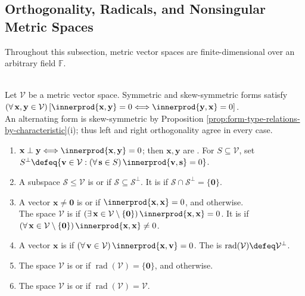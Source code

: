 \subsection{Orthogonality, Radicals, and Nonsingular Metric Spaces}

Throughout this subsection, metric vector spaces are finite-dimensional over an arbitrary field $\mathbb{F}$.

\begin{definition} \label{def:metric-orthogonality-isotropy-radical} \\
Let $\mathcal{V}$ be a metric vector space. Symmetric and skew-symmetric forms satisfy $(\forall\,\mathbf{x},\mathbf{y}\in\mathcal{V})\,[\innerprod{\mathbf{x},\mathbf{y}}=0\Longleftrightarrow\innerprod{\mathbf{y},\mathbf{x}}=0]$.\\
An alternating form is skew-symmetric by Proposition \ref{prop:form-type-relations-by-characteristic}(i); thus left and right orthogonality agree in every case.
\begin{enumerate}[label=(\roman*)]
\setlength{\itemsep}{0pt}
\item $\mathbf{x}\perp\mathbf{y}\Longleftrightarrow\innerprod{\mathbf{x},\mathbf{y}}=0$; then $\mathbf{x},\mathbf{y}$ are . For $S\subseteq\mathcal{V}$, set $S^{\perp}\defeq\{\mathbf{v}\in\mathcal{V}:(\forall\,\mathbf{s}\in S)\,\innerprod{\mathbf{v},\mathbf{s}}=0\}$.
\item A subspace $\mathcal{S}\leq\mathcal{V}$ is  or  if $\mathcal{S}\subseteq\mathcal{S}^{\perp}$. It is  if $\mathcal{S}\cap\mathcal{S}^{\perp}=\{\mathbf{0}\}$.
\item A vector $\mathbf{x}\neq\mathbf{0}$ is  or  if $\innerprod{\mathbf{x},\mathbf{x}}=0$, and  otherwise.\\
The space $\mathcal{V}$ is  if $(\exists\,\mathbf{x}\in\mathcal{V}\setminus\{\mathbf{0}\})\,\innerprod{\mathbf{x},\mathbf{x}}=0$. It is  if $(\forall\,\mathbf{x}\in\mathcal{V}\setminus\{\mathbf{0}\})\,\innerprod{\mathbf{x},\mathbf{x}}\neq0$.
\item A vector $\mathbf{x}$ is  if $(\forall\,\mathbf{v}\in\mathcal{V})\,\innerprod{\mathbf{x},\mathbf{v}}=0$. The  is $\operatorname{rad}(\mathcal{V})\defeq\mathcal{V}^{\perp}$.
\item The space $\mathcal{V}$ is  or  if $\operatorname{rad}(\mathcal{V})=\{\mathbf{0}\}$, and  otherwise.
\item The space $\mathcal{V}$ is  or  if $\operatorname{rad}(\mathcal{V})=\mathcal{V}$.
\end{enumerate}
\end{definition}

